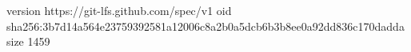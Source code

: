 version https://git-lfs.github.com/spec/v1
oid sha256:3b7d14a564e23759392581a12006c8a2b0a5dcb6b3b8ee0a92dd836c170dadda
size 1459
